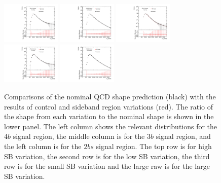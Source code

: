 \begin{figure}[htbp!]
\begin{center}
\includegraphics[width=0.25\textwidth,angle=-90]{figures/boosted/Syst_CRSB/SB_Small_compare_ThreeTag_qcd_hh.pdf}
\includegraphics[width=0.25\textwidth,angle=-90]{figures/boosted/Syst_CRSB/SB_Small_compare_TwoTag_split_qcd_hh.pdf}
\includegraphics[width=0.25\textwidth,angle=-90]{figures/boosted/Syst_CRSB/SB_Large_compare_FourTag_qcd_hh.pdf}
\includegraphics[width=0.25\textwidth,angle=-90]{figures/boosted/Syst_CRSB/SB_Large_compare_ThreeTag_qcd_hh.pdf}
\includegraphics[width=0.25\textwidth,angle=-90]{figures/boosted/Syst_CRSB/SB_Large_compare_TwoTag_split_qcd_hh.pdf}
\end{center}
\caption{Comparisons of the nominal QCD shape prediction (black) with the results of control and sideband region variations (red). The ratio of the shape from each variation to the nominal shape is shown in the lower panel. The left column shows the relevant distributions for the $4b$ signal region, the middle column is for the $3b$ signal region, and the left column is for the $2bs$ signal region. The top row is for high SB variation, the second row is for the low SB variation, the third row is for the small SB variation and the large raw is for the large SB variation.}
\label{CRSB:QCDShapeSR-SB}
\end{figure}
